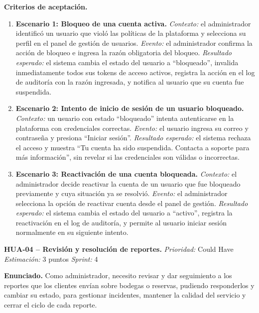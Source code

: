 \textbf{Criterios de aceptación.}
\begin{enumerate}
\item \textbf{Escenario 1: Bloqueo de una cuenta activa.} \textit{Contexto:} el administrador identificó un usuario que violó las políticas de la plataforma y selecciona su perfil en el panel de gestión de usuarios. \textit{Evento:} el administrador confirma la acción de bloqueo e ingresa la razón obligatoria del bloqueo. \textit{Resultado esperado:} el sistema cambia el estado del usuario a ``bloqueado'', invalida inmediatamente todos sus tokens de acceso activos, registra la acción en el log de auditoría con la razón ingresada, y notifica al usuario que su cuenta fue suspendida.
\item \textbf{Escenario 2: Intento de inicio de sesión de un usuario bloqueado.} \textit{Contexto:} un usuario con estado ``bloqueado'' intenta autenticarse en la plataforma con credenciales correctas. \textit{Evento:} el usuario ingresa su correo y contraseña y presiona ``Iniciar sesión''. \textit{Resultado esperado:} el sistema rechaza el acceso y muestra ``Tu cuenta ha sido suspendida. Contacta a soporte para más información'', sin revelar si las credenciales son válidas o incorrectas.
\item \textbf{Escenario 3: Reactivación de una cuenta bloqueada.} \textit{Contexto:} el administrador decide reactivar la cuenta de un usuario que fue bloqueado previamente y cuya situación ya se resolvió. \textit{Evento:} el administrador selecciona la opción de reactivar cuenta desde el panel de gestión. \textit{Resultado esperado:} el sistema cambia el estado del usuario a ``activo'', registra la reactivación en el log de auditoría, y permite al usuario iniciar sesión normalmente en su siguiente intento.
\end{enumerate}

\textbf{HUA-04 -- Revisión y resolución de reportes.} \label{req:HUA-04}
\textit{Prioridad:} Could Have \quad \textit{Estimación:} 3 puntos \quad \textit{Sprint:} 4

\textbf{Enunciado.} Como administrador, necesito revisar y dar seguimiento a los reportes que los clientes envían sobre bodegas o reservas, pudiendo responderlos y cambiar su estado, para gestionar incidentes, mantener la calidad del servicio y cerrar el ciclo de cada reporte.

